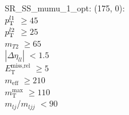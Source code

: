 SR\_SS\_mumu\_1\_opt: (175, 0): \\
$p_{\text{T}}^{l1}$ $\geq 45$ \\
$p_{\text{T}}^{l2}$ $\geq 25$ \\
$m_{T2}$ $\geq 65$ \\
$|\Delta\eta_{ll}|$ $<1.5$ \\
$E_{\text{T}}^{\text{miss,rel}}$ $\geq 5$ \\
$m_{\text{eff}}$ $\geq 210$ \\
$m_{\text{T}}^{\text{max}}$ $\geq 110$ \\
$m_{lj}$/$m_{ljj}$ $<90$ \\
